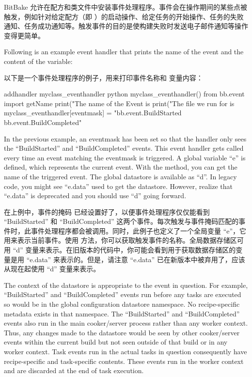 BitBake 允许在配方和类文件中安装事件处理程序。事件会在操作期间的某些点被触发，例如针对给定配方（即 ）的启动操作、给定任务的开始操作、任务的失败通知、任务成功通知等。触发事件的目的是使构建失败时发送电子邮件通知等操作变得更简单。

Following is an example event handler that prints the name of the event and the content of the  variable:

以下是一个事件处理程序的例子，用来打印事件名称和  变量内容：

\begin{pyglist}
addhandler myclass_eventhandler
python myclass_eventhandler() {
    from bb.event import getName
    print("The name of the Event is %
    print("The file we run for is %
}
myclass_eventhandler[eventmask] = "bb.event.BuildStarted
bb.event.BuildCompleted"
\end{pyglist}

In the previous example, an eventmask has been set so that the handler only sees the ``BuildStarted'' and ``BuildCompleted'' events. This event handler gets called every time an event matching the eventmask is triggered. A global variable ``e'' is defined, which represents the current event. With the  method, you can get the name of the triggered event. The global datastore is available as ``d''. In legacy code, you might see ``e.data'' used to get the datastore. However, realize that ``e.data'' is deprecated and you should use ``d'' going forward.

在上例中，事件的掩码  已经设置好了，以便事件处理程序仅仅能看到 ``BuildStarted'' 和 ``BuildCompleted'' 这两个事件。每次触发与事件掩码匹配的事件时，此事件处理程序都会被调用。同时，此例子也定义了一个全局变量 ``e''，它用来表示当前事件。使用  方法，你可以获取触发事件的名称。全局数据存储区可用 ``d'' 变量来表示。在旧版本的代码中，你可能会看到用于获取数据存储区的变量是用 ``e.data'' 来表示的。但是，请注意 ``e.data'' 已在新版本中被弃用了，应该从现在起使用 ``d'' 变量来表示。

The context of the datastore is appropriate to the event in question. For example, ``BuildStarted'' and ``BuildCompleted'' events run before any tasks are executed so would be in the global configuration datastore namespace. No recipe-specific metadata exists in that namespace. The ``BuildStarted'' and ``BuildCompleted'' events also run in the main cooker/server process rather than any worker context. Thus, any changes made to the datastore would be seen by other cooker/server events within the current build but not seen outside of that build or in any worker context. Task events run in the actual tasks in question consequently have recipe-specific and task-specific contents. These events run in the worker context and are discarded at the end of task execution.

